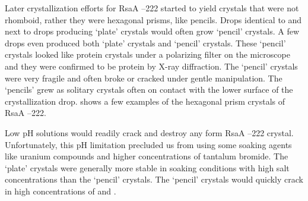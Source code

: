 Later crystallization efforts for RsaA --222 started to yield crystals that were not rhomboid, rather they were hexagonal prisms, like pencils. Drops identical to and next to drops producing `plate' crystals would often grow `pencil' crystals. A few drops even produced both `plate' crystals and `pencil' crystals. These `pencil' crystals looked like protein crystals under a polarizing filter on the microscope and they were confirmed to be protein by X-ray diffraction. The `pencil' crystals were very fragile and often broke or cracked under gentle manipulation. The `pencils' grew as solitary crystals often on contact with the lower surface of the crystallization drop.  shows a few examples of the hexagonal prism crystals of RsaA --222.

Low pH solutions would readily crack and destroy any form RsaA --222 crystal. Unfortunately, this pH limitation precluded us from using some soaking agents like uranium compounds and higher concentrations of tantalum bromide. The `plate' crystals were generally more stable in soaking conditions with high salt concentrations than the `pencil' crystals. The `pencil' crystals would quickly crack in high concentrations of  and .

